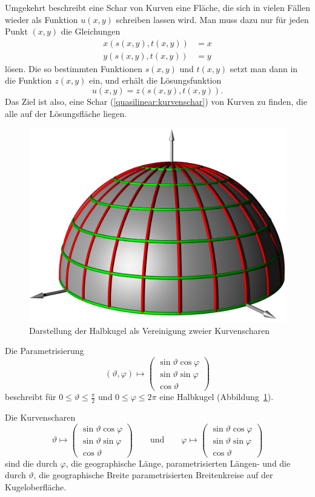 Umgekehrt beschreibt eine Schar von Kurven eine Fläche, die sich
in vielen Fällen wieder als Funktion $u(x,y)$ schreiben lassen wird.
Man muss dazu nur für jeden Punkt $(x,y)$ die Gleichungen
\begin{align*}
x(s(x,y),t(x,y))&=x\\
y(s(x,y),t(x,y))&=y
\end{align*}
lösen.
Die so bestimmten Funktionen $s(x,y)$ und $t(x,y)$ setzt man dann in
die Funktion $z(x,y)$ ein, und erhält die
Lösungsfunktion
\[
u(x,y)=z(s(x,y), t(x,y)).
\]
Das Ziel ist also, eine Schar (\ref{quasilinear:kurvenschar})
von Kurven zu finden, die alle auf der Lösungsfläche liegen.

\begin{beispiel}
\begin{figure}
\centering
\includegraphics[width=0.8\hsize]{../common/3d/kugel.jpg}
\caption{Darstellung der Halbkugel als Vereinigung zweier Kurvenscharen
\label{quasilinear:kugel}}
\end{figure}
Die Parametrisierung
\[
(\vartheta,\varphi)\mapsto
\begin{pmatrix}
\sin\vartheta\cos\varphi\\
\sin\vartheta\sin\varphi\\
\cos\vartheta
\end{pmatrix}
\]
beschreibt für $0\le \vartheta\le \frac{\pi}2$
und $0\le\varphi\le 2\pi$ eine Halbkugel (Abbildung~\ref{quasilinear:kugel}).

Die Kurvenscharen
\[
\vartheta\mapsto
\begin{pmatrix}
\sin\vartheta\cos\varphi\\
\sin\vartheta\sin\varphi\\
\cos\vartheta
\end{pmatrix}
\qquad
\text{und}
\qquad
\varphi\mapsto
\begin{pmatrix}
\sin\vartheta\cos\varphi\\
\sin\vartheta\sin\varphi\\
\cos\vartheta
\end{pmatrix}
\]
sind die durch $\varphi$, die geographische Länge, parametrisierten
Längen- und die durch $\vartheta$, die geographische Breite
parametrisierten Breitenkreise auf der Kugeloberfläche.


\end{beispiel}

